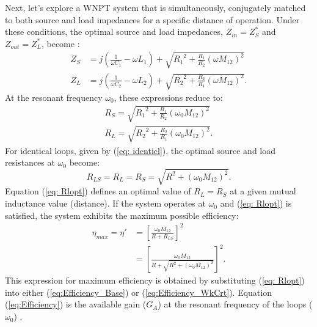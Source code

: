\documentclass[journal]{IEEEtran}
\begin{document}
Next, let's explore a WNPT system that is simultaneously, conjugately matched to both source and load impedances for a specific distance of operation. Under these conditions, the optimal source and load impedances, $Z_{in}=Z_S^*$ and $Z_{out}=Z_L^*$, become \cite{Thomas}:
\begin{subequations}
\begin{align}
Z_S &= j \left(\frac{1}{\omega C_1}-\omega L_1\right) + \sqrt{{R_1}^2 + \frac{R_1}{R_2} \left(\omega M_{12}\right)^2}
\label{eq:OptZs} \\
Z_L &= j \left(\frac{1}{\omega C_2}-\omega L_2\right) + \sqrt{{R_2}^2 + \frac{R_2}{R_1} \left(\omega M_{12}\right)^2}.
\label{eq:OptZL}
\end{align}
\label{eq:OptZ}
\end{subequations}
At the resonant frequency $\omega_0$, these expressions reduce to:
\begin{subequations}
\begin{align}
R_S=\sqrt{{R_1}^2 + \frac{R_1}{R_2}\left(\omega_0 M_{12}\right)^2}
\label{eq:ZS_at_Res} \\
R_L=\sqrt{{R_2}^2 + \frac{R_2}{R_1}\left(\omega_0 M_{12}\right)^2}.
\label{eq:ZL_at_Res}
\end{align}
\label{eq:ZSZL_at_Res}
\end{subequations}
For identical loops, given by (\ref{eq: identicl}), the optimal source and load resistances at $\omega_0$ become:
\begin{equation}
R_{LS} = R_L=R_S = \sqrt{R^2 + \left(\omega_0 M_{12}\right)^2}.
\label{eq: Rlopt}
\end{equation}
Equation (\ref{eq: Rlopt}) defines an optimal value of $R_L=R_S$ at a given mutual inductance value (distance). If the system operates at $\omega_0$ and (\ref{eq: Rlopt}) is satisfied, the system exhibits the maximum possible efficiency:
\begin{subequations}
\begin{align}
\eta_{max} =  \eta' &= \left[ \frac{\omega_0 M_{12}}{R + R_{LS}} \right]^2 \\
&= \left[\frac{\omega_0 M_{12}}{R + \sqrt{R^2 + (\omega_0 M_{12})^2}} \right]^2.
\label{eq:Efficiency}
\end{align}
\end{subequations}
This expression for maximum efficiency is obtained by substituting (\ref{eq: Rlopt}) into either (\ref{eq:Efficiency_Base}) or (\ref{eq:Efficiency_WkCrt}). Equation (\ref{eq:Efficiency}) is the available gain ($G_A$) at the resonant frequency of the loops ($\omega_0$) \cite{Pozar}.
\end{document}
